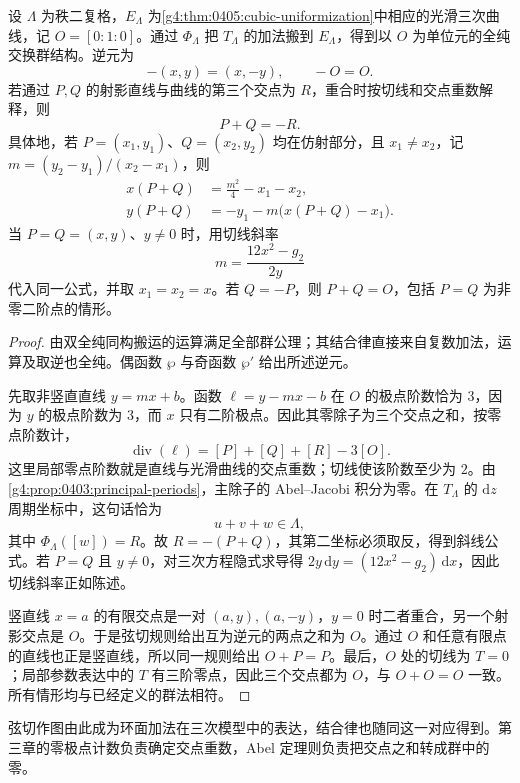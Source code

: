 \begin{proposition}\label{g4:prop:0405:chord-tangent}
	设 \(\Lambda\) 为秩二复格，\(E_\Lambda\) 为\cref{g4:thm:0405:cubic-uniformization}中相应的光滑三次曲线，记 \(O=[0:1:0]\)。通过 \(\Phi_\Lambda\) 把 \(T_\Lambda\) 的加法搬到 \(E_\Lambda\)，得到以 \(O\) 为单位元的全纯交换群结构。逆元为
	\[
		-(x,y)=(x,-y),\qquad -O=O.
	\]
	若通过 \(P,Q\) 的射影直线与曲线的第三个交点为 \(R\)，重合时按切线和交点重数解释，则
	\[
		P+Q=-R.
	\]
	具体地，若 \(P=(x_1,y_1)\)、\(Q=(x_2,y_2)\) 均在仿射部分，且 \(x_1\ne x_2\)，记 \(m=(y_2-y_1)/(x_2-x_1)\)，则
	\[
		\begin{aligned}
			x(P+Q)&=\frac{m^2}{4}-x_1-x_2,\\
			y(P+Q)&=-y_1-m\bigl(x(P+Q)-x_1\bigr).
		\end{aligned}
	\]
	当 \(P=Q=(x,y)\)、\(y\ne0\) 时，用切线斜率
	\[
		m=\frac{12x^2-g_2}{2y}
	\]
	代入同一公式，并取 \(x_1=x_2=x\)。若 \(Q=-P\)，则 \(P+Q=O\)，包括 \(P=Q\) 为非零二阶点的情形。
\end{proposition}
\begin{proof}
	由双全纯同构搬运的运算满足全部群公理；其结合律直接来自复数加法，运算及取逆也全纯。偶函数 \(\wp\) 与奇函数 \(\wp'\) 给出所述逆元。

	先取非竖直直线 \(y=mx+b\)。函数 \(\ell=y-mx-b\) 在 \(O\) 的极点阶数恰为 \(3\)，因为 \(y\) 的极点阶数为 \(3\)，而 \(x\) 只有二阶极点。因此其零除子为三个交点之和，按零点阶数计，
	\[
		\operatorname{div}(\ell)=[P]+[Q]+[R]-3[O].
	\]
	这里局部零点阶数就是直线与光滑曲线的交点重数；切线使该阶数至少为 \(2\)。由\cref{g4:prop:0403:principal-periods}，主除子的 Abel--Jacobi 积分为零。在 \(T_\Lambda\) 的 \(\mathrm{d}z\) 周期坐标中，这句话恰为
	\[
		u+v+w\in\Lambda,
	\]
	其中 \(\Phi_\Lambda([w])=R\)。故 \(R=-(P+Q)\)，其第二坐标必须取反，得到斜线公式。若 \(P=Q\) 且 \(y\ne0\)，对三次方程隐式求导得
	\(2y\,\mathrm{d}y=(12x^2-g_2)\,\mathrm{d}x\)，因此切线斜率正如陈述。

	竖直线 \(x=a\) 的有限交点是一对 \((a,y),(a,-y)\)，\(y=0\) 时二者重合，另一个射影交点是 \(O\)。于是弦切规则给出互为逆元的两点之和为 \(O\)。通过 \(O\) 和任意有限点的直线也正是竖直线，所以同一规则给出 \(O+P=P\)。最后，\(O\) 处的切线为 \(T=0\)；局部参数表达中的 \(T\) 有三阶零点，因此三个交点都为 \(O\)，与 \(O+O=O\) 一致。所有情形均与已经定义的群法相符。
\end{proof}

弦切作图由此成为环面加法在三次模型中的表达，结合律也随同这一对应得到。第三章的零极点计数负责确定交点重数，Abel 定理则负责把交点之和转成群中的零。

